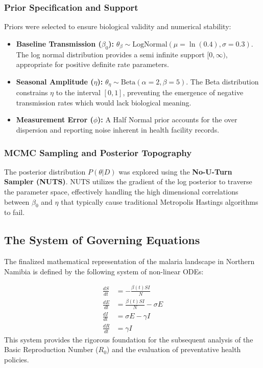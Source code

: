 \documentclass[12pt,a4paper]{report} %
\begin{document}
\subsubsection{Prior Specification and Support}
Priors were selected to ensure biological validity and numerical stability:
\begin{itemize}
\item \textbf{Baseline Transmission ($\beta_0$):} $\theta_{\beta} \sim \text{LogNormal}(\mu=\ln(0.4), \sigma=0.3)$. The log normal distribution provides a semi infinite support $[0, \infty)$, appropriate for positive definite rate parameters.
\item \textbf{Seasonal Amplitude ($\eta$):} $\theta_{\eta} \sim \text{Beta}(\alpha=2, \beta=5)$. The Beta distribution constrains $\eta$ to the interval $[0, 1]$, preventing the emergence of negative transmission rates which would lack biological meaning.
\item \textbf{Measurement Error ($\phi$):} A Half Normal prior accounts for the over dispersion and reporting noise inherent in health facility records.
\end{itemize}



\subsubsection{MCMC Sampling and Posterior Topography}
The posterior distribution $P(\theta|D)$ was explored using the \textbf{No-U-Turn Sampler (NUTS)}. NUTS utilizes the gradient of the log posterior to traverse the parameter space, effectively handling the high dimensional correlations between $\beta_0$ and $\eta$ that typically cause traditional Metropolis Hastings algorithms to fail. 

\subsection{The System of Governing Equations}
The finalized mathematical representation of the malaria landscape in Northern Namibia is defined by the following system of non-linear ODEs:

\begin{align}
\frac{dS}{dt} &= -\frac{\beta(t)SI}{N} \label{eq:dS_final}\\
\frac{dE}{dt} &= \frac{\beta(t)SI}{N} - \sigma E \label{eq:dE_final}\\
\frac{dI}{dt} &= \sigma E - \gamma I \label{eq:dI_final}\\
\frac{dR}{dt} &= \gamma I \label{eq:dR_final}
\end{align}
This system provides the rigorous foundation for the subsequent analysis of the Basic Reproduction Number ($R_0$) and the evaluation of preventative health policies.
\end{document}
